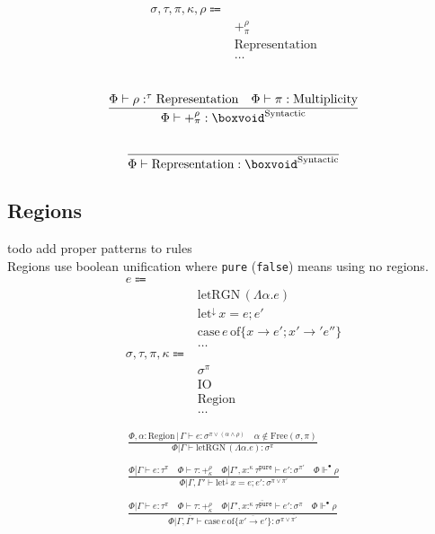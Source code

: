 \documentclass {article}
\begin{document}
\begin{align*}
\sigma, \tau, \pi, \kappa, \rho \Coloneqq & \\
& +^\rho_\pi \tag{Pretype}\\
& \text{Representation} \tag {Representation}\\
& \dots
\end{align*}

\begin{gather*}
\\
\frac
{\Phi \vdash \rho :^\tau \text{Representation} \quad \Phi \vdash \pi : \text{Multiplicity}}
{\Phi \vdash +^\rho_\pi : \boxvoid^\text{Syntactic}} \\
\\
\frac
{}
{\Phi \vdash \text{Representation} : \boxvoid^\text{Syntactic}}
\end{gather*}

\subsection{Regions}
todo add proper patterns to rules \\
Regions use boolean unification where \texttt{pure} (\texttt{false}) means using no regions.
\begin{align*}
e \Coloneqq & \\
& \text{letRGN} \, (\Lambda \alpha. e) \tag{Bind Region Type Variable (Unused)} \\
& \text{let}^\downarrow \, x = e; e' \tag{Runtime Let} \\
& \text{case} \, e \, \text{of} \{ x \to e'; x' \to' e''\} \tag{Case} \\
& \dots \\
\sigma, \tau, \pi, \kappa \Coloneqq & \\
& \sigma^\pi \tag{Region Effect} \\
& \text{IO} \tag{IO Region} \\
& \text{Region} \tag{Region} \\
& \dots
\end{align*}

\begin{gather*}
\frac
{\Phi , \alpha : \text{Region} \, | \, \Gamma \vdash e : \sigma^{\pi \lor (\alpha \land \rho)} \quad \alpha \notin \text{Free}(\sigma, \pi)}
{\Phi | \Gamma \vdash \text{letRGN} \, (\Lambda \alpha. e) : \sigma^\pi} \\
\\
\frac
{\Phi | \Gamma \vdash e : \tau^\pi \quad \Phi \vdash \tau : +^{\rho}_{\kappa} \quad
\Phi | \Gamma', x :^{\kappa} \tau^\texttt{pure} \vdash e' : \sigma^{\pi'} \quad
\Phi \Vdash^\bullet \rho}
{\Phi | \Gamma, \Gamma' \vdash \text{let}^\downarrow \, x = e; e' : \sigma^{\pi \lor \pi'}} \\
\\
\frac
{\Phi | \Gamma \vdash e : \tau^\pi \quad \Phi \vdash \tau : +^{\rho}_{\kappa} \quad
\overline{ \Phi | \Gamma', x :^{\kappa} \tau^\texttt{pure} \vdash e' : \sigma^\pi } \quad
\Phi \Vdash^\bullet \rho}
{\Phi | \Gamma, \overline {\Gamma'} \vdash \text{case} \, e \, \text{of} \{ \overline {x' \to  e' } \} : \sigma^{\pi \lor \overline{\pi'}}} \\
\end{gather*}
\end{document}
